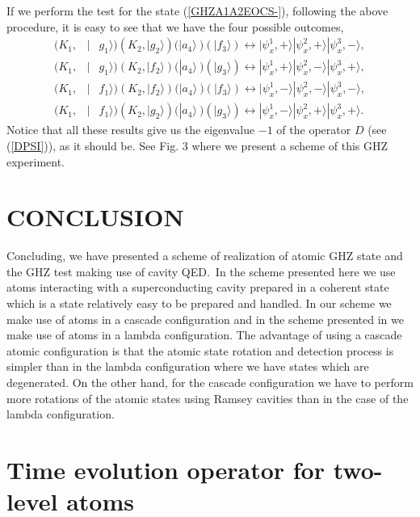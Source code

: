 \documentclass[12pt,thmsa]{article}
\begin{document}
If we perform the test for the state (\ref{GHZA1A2EOCS-}), following the
above procedure, it is easy to see that we have the four possible outcomes,%
\begin{eqnarray}
(K_{1}, &\mid &g_{1}\rangle )(K_{2},\mid g_{2}\rangle )(|a_{4}\rangle \
)(\mid f_{3}\rangle )\longleftrightarrow |\psi _{x}^{1},+\rangle |\psi
_{x}^{2},+\rangle |\psi _{x}^{3},-\rangle ,  \nonumber \\
(K_{1}, &\mid &g_{1}\rangle )(K_{2},\mid f_{2}\rangle )(|a_{4}\rangle \
)(\mid g_{3}\rangle )\longleftrightarrow |\psi _{x}^{1},+\rangle |\psi
_{x}^{2},-\rangle |\psi _{x}^{3},+\rangle ,  \nonumber \\
(K_{1}, &\mid &f_{1}\rangle )(K_{2},\mid f_{2}\rangle )(|a_{4}\rangle \
)(\mid f_{3}\rangle )\longleftrightarrow |\psi _{x}^{1},-\rangle |\psi
_{x}^{2},-\rangle |\psi _{x}^{3},-\rangle ,  \nonumber \\
(K_{1}, &\mid &f_{1}\rangle )(K_{2},\mid g_{2}\rangle )(|a_{4}\rangle \
)(\mid g_{3}\rangle )\longleftrightarrow |\psi _{x}^{1},-\rangle |\psi
_{x}^{2},+\rangle |\psi _{x}^{3},+\rangle .
\end{eqnarray}%
Notice that all these results give us the eigenvalue $-1$ of the operator $D$
(see (\ref{DPSI})), as it should be. See Fig. 3 where we present a scheme of
this GHZ experiment.

\section{CONCLUSION}

Concluding, we have presented a scheme of realization of atomic GHZ state
and the GHZ test making use of cavity QED.\ In the scheme presented here we
use atoms interacting with a superconducting cavity prepared in a coherent
state which is a state relatively easy to be prepared and handled. In our
scheme we make use of atoms in a cascade configuration and in the scheme
presented in \cite{GHZLambdaat} we make use of atoms in a lambda
configuration. The advantage of using a cascade atomic configuration is that
the atomic state rotation and detection process is simpler than in the
lambda configuration where we have states which are degenerated. On the
other hand, for the cascade configuration we have to perform more rotations
of the atomic states using Ramsey cavities than in the case of the lambda
configuration.

\appendix

\section{\protect\bigskip Time evolution operator for two-level atoms}
\end{document}
